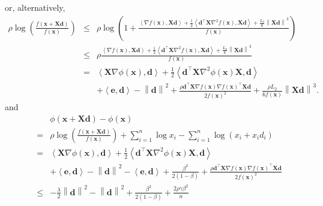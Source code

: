 \documentclass{article}
\newcommand{\x}{\mathbf{x}}
\newcommand{\0}{\textbf{0}}
\newcommand{\e}{\mathbf{e}}
\newcommand{\n}{\nabla}
\newcommand{\X}{\mathbf{X}}
\newcommand{\tmd}{\mathbf{d}}
\begin{document}
or, alternatively,
\begin{eqnarray*}
  \rho \log \left( \frac{f \left( \x + \X \tmd \right)}{f \left( \x \right)}
  \right) & \leq & \rho \log \left( 1 + \frac{\left\langle \n f \left( \x
  \right), \X \tmd \right\rangle + \frac{1}{2} \left\langle \tmd^{\top} \X
  \n^2 f \left( \x \right), \X \tmd \right\rangle + \frac{L_2}{6} \left\| \X
  \tmd \right\|^3}{f \left( \x \right)} \right)\\
  & \leq & \rho \frac{\left\langle \n f \left( \x \right), \X \tmd
  \right\rangle + \frac{1}{2} \left\langle \tmd^{\top} \X \n^2 f \left( \x
  \right), \X \tmd \right\rangle + \frac{L_2}{6} \left\| \X \tmd \right\|^3}{f
  \left( \x \right)}\\
  & = & \left\langle \X \n \phi \left( \x \right), \tmd \right\rangle +
  \frac{1}{2} \left\langle \tmd^{\top} \X \nabla^2 \phi \left( \x \right) \X,
  \tmd \right\rangle\\
  &  & + \left\langle \e, \tmd \right\rangle - \left\| \tmd \right\|^2 +
  \frac{\rho \tmd^{\top} \X \n f \left( \x \right) \n f \left( \x
  \right)^{\top} \X \tmd}{2 f \left( \x \right)^2} + \frac{\rho L_2}{6 f
  \left( \x \right)} \left\| \X \tmd \right\|^3 .
\end{eqnarray*}
and
\begin{eqnarray*}
  &  & \phi \left( \x + \X \tmd \right) - \phi \left( \x \right)\\
  & = & \rho \log \left( \frac{f \left( \x + \X \tmd \right)}{f \left( \x
  \right)} \right) + \sum_{i = 1}^n \log x_i - \sum_{i = 1}^n \log (x_i + x_i
  d_i)\\
  & = & \left\langle \X \n \phi \left( \x \right), \tmd \right\rangle +
  \frac{1}{2} \left\langle \tmd^{\top} \X \nabla^2 \phi \left( \x \right) \X,
  \tmd \right\rangle\\
  &  & + \left\langle \e, \tmd \right\rangle - \left\| \tmd \right\|^2 -
  \left\langle \e, \tmd \right\rangle + \frac{\beta^2}{2 (1 - \beta)} +
  \frac{\rho \tmd^{\top} \X \n f \left( \x \right) \n f \left( \x
  \right)^{\top} \X \tmd}{2 f \left( \x \right)^2}\\
  & \leq & - \frac{\lambda}{2} \left\| \tmd \right\|^2 - \left\| \tmd
  \right\|^2 + \frac{\beta^2}{2 (1 - \beta)} + \frac{2 \rho \gamma \beta^2}{n}
\end{eqnarray*}
\end{document}
